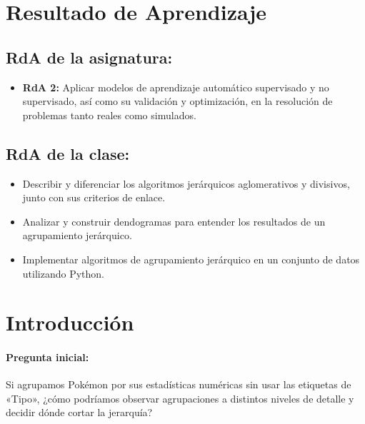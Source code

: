 \documentclass[a4,11pt]{aleph-notas}
\begin{document}
\encabezado

\section*{Resultado de Aprendizaje}

\subsection*{RdA de la asignatura:}
\begin{itemize}[leftmargin=*]
    \item \textbf{RdA 2:} Aplicar modelos de aprendizaje automático supervisado y no supervisado, así como su validación y optimización, en la resolución de problemas tanto reales como simulados.
\end{itemize}

\subsection*{RdA de la clase:}
\begin{itemize}[leftmargin=*]
    \item Describir y diferenciar los algoritmos jerárquicos aglomerativos y divisivos, junto con sus criterios de enlace.
    \item Analizar y construir dendogramas para entender los resultados de un agrupamiento jerárquico.
    \item Implementar algoritmos de agrupamiento jerárquico en un conjunto de datos utilizando Python.
\end{itemize}

\section*{Introducción}

\paragraph{Pregunta inicial:} 
Si agrupamos Pokémon por sus estadísticas numéricas sin usar las etiquetas de «Tipo», ¿cómo podríamos observar agrupaciones a distintos niveles de detalle y decidir dónde cortar la jerarquía?
\end{document}
